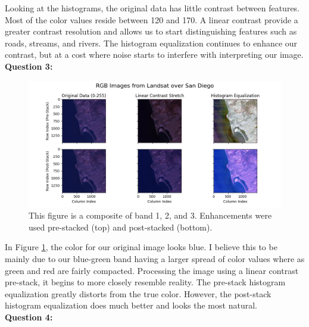 \documentclass{homework}
\begin{document}
Looking at the histograms, the original data has little contrast between features. Most of the color values reside between 120 and 170. A linear contrast provide a greater contrast resolution and allows us to start distinguishing features such as roads, streams, and rivers. The histogram equalization continues to enhance our contrast, but at a cost where noise starts to interfere with interpreting our image. \\

\textbf{Question 3:} \\

\begin{figure}[H]
    \centering
    \includegraphics[width=\textwidth]{images/RGB_Enhanced_Images.png}
    \caption{This figure is a composite of band 1, 2, and 3. Enhancements were used pre-stacked (top) and post-stacked (bottom). }
    \label{fig:RGB_Enchanced}
\end{figure}

In Figure \ref{fig:RGB_Enchanced}, the color for our original image looks blue. I believe this to be mainly due to our blue-green band having a larger spread of color values where as green and red are fairly compacted. Processing the image using a linear contrast pre-stack, it begins to more closely resemble reality. The pre-stack histogram equalization greatly distorts from the true color. However, the post-stack histogram equalization does much better and looks the most natural. \\

\textbf{Question 4:} \\
\end{document}
